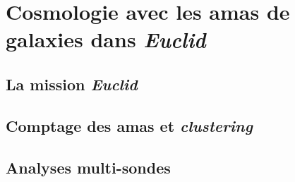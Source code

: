 \documentclass[a4paper, 12pt]{report}
\begin{document}
{\color{vert}\lipsum[2-5]}


%
%   
%
\chapter{Cosmologie avec les amas de galaxies dans \emph{Euclid}}

{\color{vert}\lipsum[2-3]}

\section{La mission \emph{Euclid}}
{\color{vert}\lipsum[2-5]}

\section{Comptage des amas et \emph{clustering}}
{\color{vert}\lipsum[2-5]}

\section{Analyses multi-sondes}
{\color{vert}\lipsum[2-5]}


%


\end{document}
